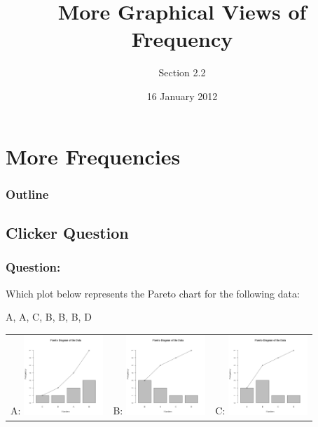 
\section{More Frequencies}

\title{More Graphical Views of Frequency}
\subtitle{Section 2.2}

\date{16 January 2012}

\begin{frame}
  \titlepage
\end{frame}

\begin{frame}
  \frametitle{Outline}
  \tableofcontents[pausesection,hideothersubsections,sectionstyle=show/hide]
\end{frame}


\subsection{Clicker Question}


\begin{frame}
  \frametitle{Question:}

  Which plot below represents the Pareto chart for the following data:

    A, A, C, B, B, B, D

    \begin{tabular}{ccc}
      A: \includegraphics[width=3cm]{img/paretoQuizW1D2-a} &
      B: \includegraphics[width=3cm]{img/paretoQuizW1D2-b} &
      C: \includegraphics[width=3cm]{img/paretoQuizW1D2-c}
  \end{tabular}

\end{frame}


